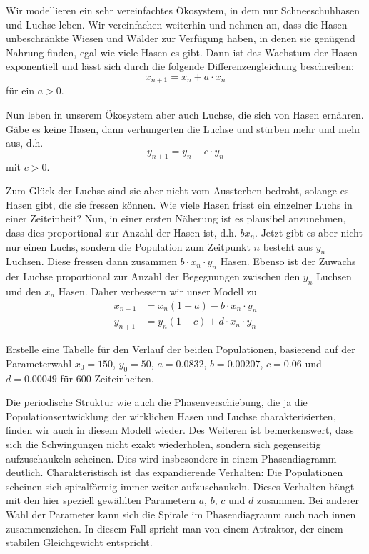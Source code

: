 \documentclass[%
11pt,%
twoside,%
titlepage,%
german,%
headsepline%
]{scrartcl}
\begin{document}
Wir modellieren ein sehr vereinfachtes Ökosystem, in dem nur Schneeschuhhasen und Luchse leben. Wir vereinfachen weiterhin und nehmen an, dass die Hasen unbeschränkte Wiesen und Wälder zur Verfügung haben, in denen sie genügend Nahrung finden, egal wie viele Hasen es gibt. Dann ist das Wachstum der Hasen exponentiell und lässt sich durch die folgende Differenzengleichung beschreiben:
$$x_{n+1}=x_n+a\cdot x_n$$
für ein $a>0$.

Nun leben in unserem Ökosystem aber auch Luchse, die sich von Hasen ernähren. Gäbe es keine Hasen, dann verhungerten die Luchse und stürben mehr und mehr aus, d.h.
$$y_{n+1}=y_n-c\cdot y_n$$
mit $c>0$.

Zum Glück der Luchse sind sie aber nicht vom Aussterben bedroht, solange es Hasen gibt, die sie fressen können. Wie viele Hasen frisst ein einzelner Luchs in einer Zeiteinheit? Nun, in einer ersten Näherung ist es plausibel anzunehmen, dass dies proportional zur Anzahl der Hasen ist, d.h. $bx_n$. Jetzt gibt es aber nicht nur einen Luchs, sondern die Population zum Zeitpunkt $n$ besteht aus $y_n$ Luchsen. Diese fressen dann zusammen $b\cdot x_n\cdot y_n$ Hasen. Ebenso ist der Zuwachs der Luchse proportional zur Anzahl der Begegnungen zwischen den $y_n$ Luchsen und den $x_n$ Hasen. Daher verbessern wir unser Modell zu
\begin{align*}
x_{n+1}&=x_n(1+a)-b\cdot x_n\cdot y_n\\
y_{n+1}&=y_n(1-c)+d\cdot x_n\cdot y_n
\end{align*}

\begin{ueb}
Erstelle eine Tabelle für den Verlauf der beiden Populationen, basierend auf der Parameterwahl $x_0=150$, $y_0=50$, $a=0.0832$, $b=0.00207$, $c=0.06$ und $d=0.00049$ für $600$ Zeiteinheiten.
\end{ueb}

Die periodische Struktur wie auch die Phasenverschiebung, die ja die Populationsentwicklung der wirklichen Hasen und Luchse charakterisierten, finden wir auch in diesem Modell wieder. Des Weiteren ist bemerkenswert, dass sich die Schwingungen nicht exakt wiederholen, sondern sich gegenseitig aufzuschaukeln scheinen. Dies wird insbesondere in einem Phasendiagramm deutlich. Charakteristisch ist das expandierende Verhalten: Die Populationen scheinen sich spiralförmig immer weiter aufzuschaukeln. Dieses Verhalten hängt mit den hier speziell gewählten Parametern $a$, $b$, $c$ und $d$ zusammen. Bei anderer Wahl der Parameter kann sich die Spirale im Phasendiagramm auch nach innen zusammenziehen. In diesem Fall spricht man von einem Attraktor, der einem stabilen Gleichgewicht entspricht.
\end{document}
